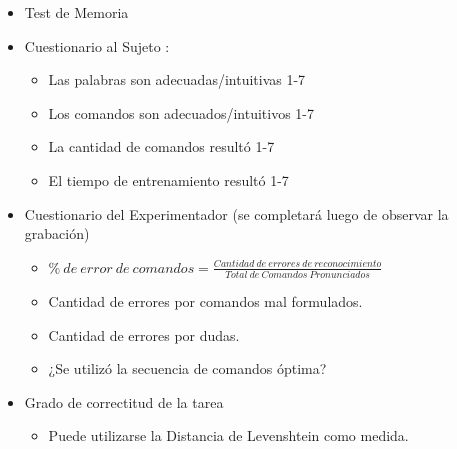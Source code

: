 \begin{itemize}
    \item Test de Memoria
    \item Cuestionario al Sujeto :
    \begin{itemize}
        \item Las palabras son adecuadas/intuitivas 1-7
        \item Los comandos son adecuados/intuitivos 1-7
        \item La cantidad de comandos result\'o 1-7
        \item El tiempo de entrenamiento result\'o 1-7
    \end{itemize}
    \item Cuestionario del Experimentador (se completar\'a luego de observar la grabaci\'on)
    \begin{itemize}
        \item $ \% \: de \: error \: de \: comandos = \frac{Cantidad \:de \:errores \:de \:reconocimiento}{Total \:de \:Comandos \:Pronunciados}$
        \item Cantidad de errores por comandos mal formulados.
        \item Cantidad de errores por dudas.
        \item ¿Se utiliz\'o la secuencia de comandos \'optima?
    \end{itemize}
    \item Grado de correctitud de la tarea
    \begin{itemize}
    \item Puede utilizarse la Distancia de Levenshtein como medida.
    \end{itemize}
\end{itemize}

